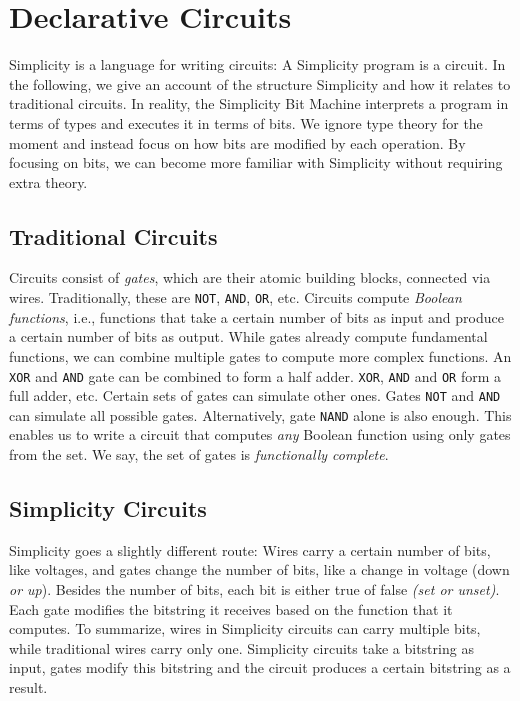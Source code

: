 \chapter{Declarative Circuits}%
\label{ch:declarative}

Simplicity is a language for writing circuits:
A Simplicity program is a circuit.
%
In the following,
we give an account of the structure Simplicity and how it relates to traditional circuits.
In reality,
the Simplicity Bit Machine interprets a program in terms of types and executes it in terms of bits.
We ignore type theory for the moment and instead focus on how bits are modified by each operation.
By focusing on bits,
we can become more familiar with Simplicity without requiring extra theory.

\section{Traditional Circuits}

Circuits consist of \emph{gates},
which are their atomic building blocks,
connected via wires.
Traditionally,
these are \texttt{NOT}, \texttt{AND}, \texttt{OR}, etc.
Circuits compute \emph{Boolean functions},
i.e., functions that take a certain number of bits as input and produce a certain number of bits as output.
While gates already compute fundamental functions,
we can combine multiple gates to compute more complex functions.
An \texttt{XOR} and \texttt{AND} gate can be combined to form a half adder.
\texttt{XOR}, \texttt{AND} and \texttt{OR} form a full adder, etc.
Certain sets of gates can simulate other ones.
Gates \texttt{NOT} and \texttt{AND} can simulate all possible gates.
Alternatively,
gate \texttt{NAND} alone is also enough.
This enables us to write a circuit that computes \emph{any} Boolean function using only gates from the set.
We say,
the set of gates is \emph{functionally complete}.

\section{Simplicity Circuits}

Simplicity goes a slightly different route:
Wires carry a certain number of bits, like voltages,
and gates change the number of bits, like a change in voltage (down \emph{or up}).
Besides the number of bits,
each bit is either true of false \emph{(set or unset)}.
Each gate modifies the bitstring it receives based on the function that it computes.
%
To summarize,
wires in Simplicity circuits can carry multiple bits,
while traditional wires carry only one.
Simplicity circuits take a bitstring as input,
gates modify this bitstring
and the circuit produces a certain bitstring as a result.

